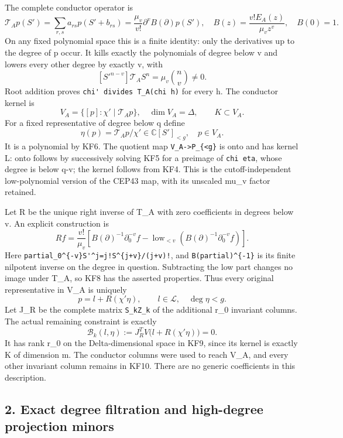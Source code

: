 The complete conductor operator is \[
\mathcal T_Ap(S')=\sum_{r,s}a_{rs}p(S'+b_{rs})
=\frac{\mu_v}{v!}\partial^v B(\partial)p(S'),\quad
B(z)=\frac{v!E_A(z)}{\mu_vz^v},\quad B(0)=1.
\tag{KF4}
\] On any fixed polynomial space this is a finite identity: only the derivatives up to the degree of p occur. It kills exactly the polynomials of degree below v and lowers every other degree by exactly v, with \[
[S'^{n-v}]\mathcal T_A S^n=\mu_v\binom nv\ne0.
\tag{KF5}
\] Root addition proves \nolinkurl{chi' divides T_A(chi h)} for every h. The conductor kernel is \[
V_A=\{[p]:\chi'\mid\mathcal T_Ap\},\quad \dim V_A=\Delta,
\qquad K\subset V_A.
\tag{KF6}
\] For a fixed representative of degree below q define \[
\eta(p)=\mathcal T_Ap/\chi'\in\mathbb C[S']_{<g},\quad p\in V_A.
\tag{KF7}
\] It is a polynomial by KF6. The quotient map \texttt{V\_A-\textgreater{}P\_\{\textless{}g\}} is onto and has kernel L: onto follows by successively solving KF5 for a preimage of \texttt{chi\textquotesingle{}\ eta}, whose degree is below q-v; the kernel follows from KF4. This is the cutoff-independent low-polynomial version of the CEP43 map, with its unscaled mu\_v factor retained.

Let R be the unique right inverse of T\_A with zero coefficients in degrees below v. An explicit construction is \[
R f=\frac{v!}{\mu_v}
 \left[B(\partial)^{-1}\partial^{-v}_0f
 -\operatorname{low}_{<v}(B(\partial)^{-1}\partial^{-v}_0f)\right].
\tag{KF8}
\] Here \nolinkurl{partial_0^{-v}S'^j=j!S^{j+v}/(j+v)!}, and \texttt{B(partial)\^{}\{-1\}} is its finite nilpotent inverse on the degree in question. Subtracting the low part changes no image under T\_A, so KF8 has the asserted properties. Thus every original representative in V\_A is uniquely \[
p=l+R(\chi'\eta),\qquad l\in\mathcal L,\quad\deg\eta<g.
\tag{KF9}
\] Let J\_R be the complete matrix \texttt{S\_kZ\_k} of the additional r\_0 invariant columns. The actual remaining constraint is exactly \[
\mathcal B_k(l,\eta):=J_R^TV\bigl(l+R(\chi'\eta)\bigr)=0.
\tag{KF10}
\] It has rank r\_0 on the Delta-dimensional space in KF9, since its kernel is exactly K of dimension m. The conductor columns were used to reach V\_A, and every other invariant column remains in KF10. There are no generic coefficients in this description.

\subsection{2. Exact degree filtration and high-degree projection minors}\label{exact-degree-filtration-and-high-degree-projection-minors}

